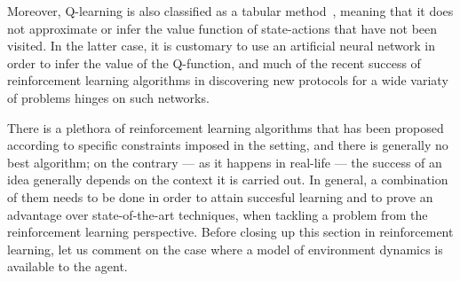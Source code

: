 Moreover, Q-learning is also classified as a tabular method~\cite{Sutton2018}, meaning that it does not approximate or infer the value function of state-actions that have not been visited. In the latter case, it is customary to use an artificial neural network in order to infer the value of the Q-function, and much of the recent success of reinforcement learning algorithms in discovering new protocols for a wide variaty of problems hinges on such networks.

There is a plethora of reinforcement learning algorithms that has been proposed according to specific constraints imposed in the setting, and there is generally no best algorithm; on the contrary --- as it happens in real-life --- the success of an idea generally depends on the context it is carried out. In general, a combination of them needs to be done in order to attain succesful learning and to prove an advantage over state-of-the-art techniques, when tackling a problem from the reinforcement learning perspective. Before closing up this section in reinforcement learning, let us comment on the case where a model of environment dynamics is available to the agent.
